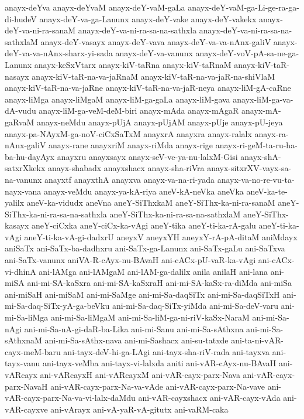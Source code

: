 {anayx-deYva
anayx-deYvaM
anayx-deY-vaM-gaLa
anayx-deY-vaM-ga-Li-ge-ra-ga-di-hudeV
anayx-deY-va-ga-Lanunx
anayx-deY-vake
anayx-deY-vakekx
anayx-deY-va-ni-ra-sanaM
anayx-deY-va-ni-ra-sa-na-sathxla
anayx-deY-va-ni-ra-sa-na-sathxlaM
anayx-deY-vasayx
anayx-deY-vava
anayx-deY-va-va-nAnx-galiV
anayx-deY-va-va-nAnx-sharx-yi-sada
anayx-deY-va-vanunx
anayx-deY-voV-pA-sa-ne-ga-Lanunx
anayx-keSxVtarx
anayx-kiV-taRna
anayx-kiV-taRnaM
anayx-kiV-taR-nasayx
anayx-kiV-taR-na-va-jaRnaM
anayx-kiV-taR-na-va-jaR-na-shiVlaM
anayx-kiV-taR-na-va-jaRne
anayx-kiV-taR-na-va-jaR-neya
anayx-liM-gA-caRne
anayx-liMga
anayx-liMgaM
anayx-liM-ga-gaLa
anayx-liM-gava
anayx-liM-ga-va-dA-vudu
anayx-liM-ga-veM-deM-biri
anayx-mAda
anayx-mAgaR
anayx-mA-gaRvaM
anayx-neMdu
anayx-pUjA
anayx-pUjAM
anayx-pUje
anayx-pU-jeya
anayx-pa-NAyxM-ga-noV-ciCxSaTxM
anayxrA
anayxra
anayx-ralalx
anayx-ra-nAnx-galiV
anayx-rane
anayxriM
anayx-riMda
anayx-rige
anayx-ri-geM-ta-ru-ha-ba-hu-dayAyx
anayxru
anayxsayx
anayx-seV-ve-ya-nu-lalxM-Gisi
anayx-shA-satxrXkekx
anayx-shabadx
anayxshacx
anayx-sha-riVra
anayx-sitxrXV-vayx-sa-na-vanunx
anayxtf
anayxthA
anayxva
anayx-va-na-ri-yada
anayx-va-no-re-vu-ta-nayx-vana
anayx-veMdu
anayx-ya-kA-riya
aneV-kA-neVka
aneVka
aneV-ka-te-yalilx
aneV-ka-vidudx
aneVna
aneY-SiThxkaM
aneY-SiThx-ka-ni-ra-sanaM
aneY-SiThx-ka-ni-ra-sa-na-sathxla
aneY-SiThx-ka-ni-ra-sa-na-sathxlaM
aneY-SiThx-kasayx
aneY-ciCxka
aneY-ciCx-ka-vAgi
aneY-tika
aneY-ti-ka-rA-galu
aneY-ti-ka-vAgi
aneY-ti-ka-vA-gi-dadxrU
aneyxV
aneyxYH
aneyxY-rA-pA-ditaM
aniMdayx
aniSaTx
ani-SaTx-ba-dadhxru
ani-SaTx-ga-Lanunx
ani-SaTx-gaLu
ani-SaTxva
ani-SaTx-vanunx
aniVA-R-cAyx-nu-BAvaH
ani-cACx-pU-vaR-ka-vAgi
ani-cACx-vi-dhinA
ani-lAMga
ani-lAMgaM
ani-lAM-ga-dalilx
anila
anilaH
ani-lana
ani-miSA
ani-mi-SA-kaSxra
ani-mi-SA-kaSxraH
ani-mi-SA-kaSx-ra-diMda
ani-miSa
ani-miSaH
ani-miSaM
ani-mi-SaMge
ani-mi-Sa-daqSiTx
ani-mi-Sa-daqSiTxH
ani-mi-Sa-daq-SiTx-yA-ga-beVku
ani-mi-Sa-daq-SiTx-yiMda
ani-mi-Sa-deV-varu
ani-mi-Sa-liMga
ani-mi-Sa-liMgaM
ani-mi-Sa-liM-ga-ni-riV-kaSx-NaraM
ani-mi-Sa-nAgi
ani-mi-Sa-nA-gi-daR-ba-Lika
ani-mi-Sanu
ani-mi-Sa-sAthxna
ani-mi-Sa-sAthxnaM
ani-mi-Sa-sAthx-nava
ani-mi-Sashacx
ani-su-tatxde
ani-ta-ni-vAR-cayx-meM-baru
ani-tayx-deV-hi-ga-LAgi
ani-tayx-sha-riV-rada
ani-tayxva
ani-tayx-vanu
ani-tayx-veMba
ani-tayx-vi-lalxda
aniti
ani-vAR-cAyx-nu-BAvaH
ani-vARcayx
ani-vARcayxH
ani-vARcayxM
ani-vAR-cayx-parx-Nava
ani-vAR-cayx-parx-NavaH
ani-vAR-cayx-parx-Na-va-vAde
ani-vAR-cayx-parx-Na-vave
ani-vAR-cayx-parx-Na-va-vi-lalx-daMdu
ani-vAR-cayxshacx
ani-vAR-cayx-vAda
ani-vAR-cayxve
ani-vArayx
ani-vA-yaR-vA-gitutx
ani-vaRM-caka
}
